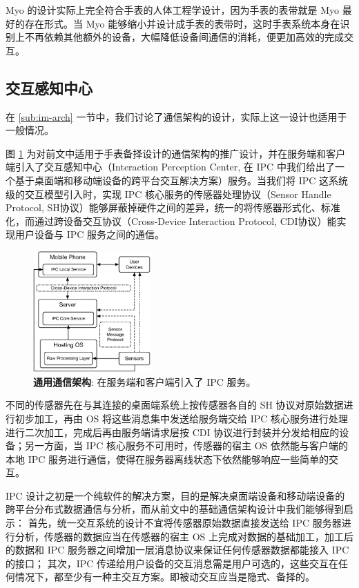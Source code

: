 Myo 的设计实际上完全符合手表的人体工程学设计，因为手表的表带就是 Myo 最好的存在形式。当 Myo 能够缩小并设计成手表的表带时，这时手表系统本身在识别上不再依赖其他额外的设备，大幅降低设备间通信的消耗，便更加高效的完成交互。

\subsection{交互感知中心}

在 \ref{sub:im-arch} 一节中，我们讨论了通信架构的设计，实际上这一设计也适用于一般情况。

图 \ref{fig:universe-arch} 为对前文中适用于手表备择设计的通信架构的推广设计，并在服务端和客户端引入了交互感知中心（Interaction Perception Center, 在 IPC 中我们给出了一个基于桌面端和移动端设备的跨平台交互解决方案）服务\cite{Changkun:2015ipc}。当我们将 IPC 这系统级的交互模型引入时，实现 IPC 核心服务的传感器处理协议（Sensor Handle Protocol, SH协议）能够屏蔽掉硬件之间的差异，统一的将传感器形式化、标准化，而通过跨设备交互协议（Cross-Device Interaction Protocol, CDI协议）能实现用户设备与 IPC 服务之间的通信。

\begin{figure}[H]
    \kaishu
    \centering
    \includegraphics[width=0.4\textwidth]{figures/universe-arch}
    \caption{\kaishu \textbf{通用通信架构}: 在服务端和客户端引入了 IPC 服务。}
    \label{fig:universe-arch}
\end{figure}

不同的传感器先在与其连接的桌面端系统上按传感器各自的 SH 协议对原始数据进行初步加工，再由 OS 将这些消息集中发送给服务端交给 IPC 核心服务进行处理进行二次加工，完成后再由服务端请求层按 CDI 协议进行封装并分发给相应的设备；另一方面，当 IPC 核心服务不可用时，传感器的宿主 OS 依然能与客户端的本地 IPC 服务进行通信，使得在服务器离线状态下依然能够响应一些简单的交互。

IPC 设计之初是一个纯软件的解决方案，目的是解决桌面端设备和移动端设备的跨平台分布式数据通信与分析，而从前文中的基础通信架构设计中我们能够得到启示：
首先，统一交互系统的设计不宜将传感器原始数据直接发送给 IPC 服务器进行分析，传感器的数据应当在传感器的宿主 OS 上完成对数据的基础加工，加工后的数据和 IPC 服务器之间增加一层消息协议来保证任何传感器数据都能接入 IPC 的接口；
其次，IPC 传递给用户设备的交互消息需是用户可选的，这些交互在任何情况下，都至少有一种主交互方案。即被动交互应当是隐式、备择的。

